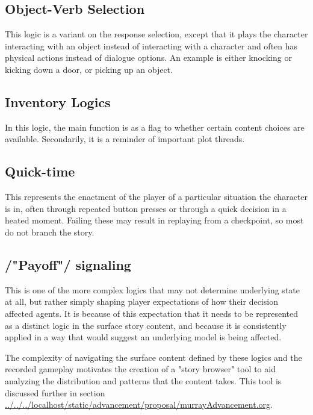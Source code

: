 \subsection{Object-Verb Selection}
\label{sec:orgheadline2}
This logic is a variant on the response selection, except that it
plays the character interacting with an object instead of interacting
with a character and often has physical actions instead of dialogue
options. An example is either knocking or kicking down a door, or
picking up an object.

\subsection{Inventory Logics}
\label{sec:orgheadline3}
In this logic, the main function is as a flag to whether certain
content choices are available. Secondarily, it is a reminder of
important plot threads.
\subsection{Quick-time}
\label{sec:orgheadline4}
This represents the enactment of the player of a particular situation
the character is in, often through repeated button presses or through
a quick decision in a heated moment. Failing these may result in
replaying from a checkpoint, so most do not branch the story.
\subsection{/"Payoff"/ signaling}
\label{sec:orgheadline5}

This is one of the more complex logics that may not determine
underlying state at all, but rather simply shaping player expectations
of how their decision affected agents. It is because of this
expectation that it needs to be represented as a distinct logic in the
surface story content, and because it is consistently applied in a way
that would suggest an underlying model is being affected.

The complexity of navigating the surface content defined by these
logics and the recorded gameplay motivates the creation of a "story
browser" tool to aid analyzing the distribution and patterns that the
content takes. This tool is discussed further in section
\url{../../../localhost/static/advancement/proposal/murrayAdvancement.org}.
